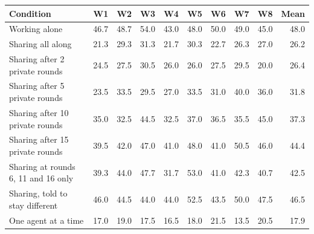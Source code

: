 \begin{tabular}{l rrrrrrrr r}
\toprule
Condition & W1 & W2 & W3 & W4 & W5 & W6 & W7 & W8 & Mean \\
\midrule
Working alone & 46.7 & 48.7 & 54.0 & 43.0 & 48.0 & 50.0 & 49.0 & 45.0 & 48.0 \\
Sharing all along & 21.3 & 29.3 & 31.3 & 21.7 & 30.3 & 22.7 & 26.3 & 27.0 & 26.2 \\
Sharing after 2 private rounds & 24.5 & 27.5 & 30.5 & 26.0 & 26.0 & 27.5 & 29.5 & 20.0 & 26.4 \\
Sharing after 5 private rounds & 23.5 & 33.5 & 29.5 & 27.0 & 33.5 & 31.0 & 40.0 & 36.0 & 31.8 \\
Sharing after 10 private rounds & 35.0 & 32.5 & 44.5 & 32.5 & 37.0 & 36.5 & 35.5 & 45.0 & 37.3 \\
Sharing after 15 private rounds & 39.5 & 42.0 & 47.0 & 41.0 & 48.0 & 41.0 & 50.5 & 46.0 & 44.4 \\
Sharing at rounds 6, 11 and 16 only & 39.3 & 44.0 & 47.7 & 31.7 & 53.0 & 41.0 & 42.3 & 40.7 & 42.5 \\
Sharing, told to stay different & 46.0 & 44.5 & 44.0 & 44.0 & 52.5 & 43.5 & 50.0 & 47.5 & 46.5 \\
One agent at a time & 17.0 & 19.0 & 17.5 & 16.5 & 18.0 & 21.5 & 13.5 & 20.5 & 17.9 \\
\bottomrule
\end{tabular}